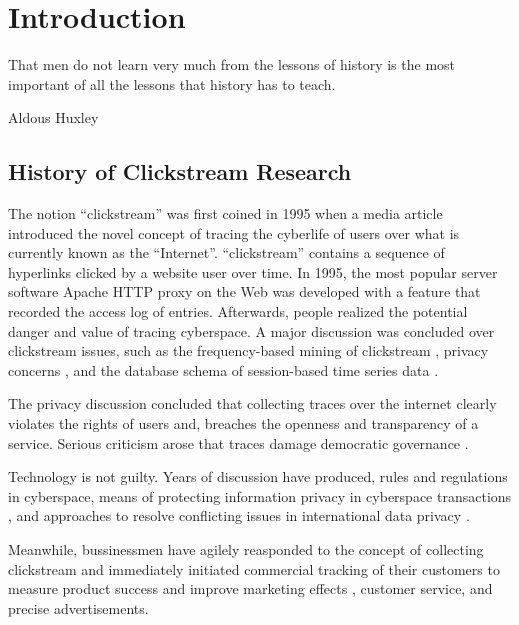 \section{Introduction}
\label{ch:intro}

\epigraph{That men do not learn very much from the lessons of history is the most important of all the lessons that history has to teach.}{Aldous Huxley}

\subsection{History of Clickstream Research}

The notion ``clickstream'' \cite{friedman1995} was first coined in 1995 when a media 
article introduced the novel concept of tracing the cyberlife of users over what is currently known
as the ``Internet''. ``clickstream'' contains a sequence of hyperlinks clicked by a 
website user over time. In 1995, the most popular server software 
Apache HTTP \cite{apache1995http} proxy on the Web was developed with a feature that 
recorded the access log of entries. Afterwards, people realized the potential danger and value 
of tracing cyberspace. A major discussion was concluded over clickstream issues, such as 
the frequency-based mining of clickstream \cite{brodwin1995}, privacy concerns
\cite{reidenberg1996governing}, and the database schema of session-based time series data 
\cite{courtheoux2000database}.

The privacy discussion concluded that collecting traces over the internet clearly violates 
the rights of users and,
breaches the openness and transparency of a service.
Serious criticism arose that traces damage democratic governance \cite{gindin1997lost}.

Technology is not guilty. Years of discussion have produced, rules 
\cite{reidenberg1996governing} and regulations \cite{skok1999establishing} in cyberspace,
means of protecting information privacy in cyberspace transactions \cite{kang1997information},
and approaches to resolve conflicting issues in international data privacy \cite{reidenberg1999resolving}.

Meanwhile, bussinessmen have agilely reasponded to the concept of collecting clickstream 
and immediately initiated commercial tracking of their customers to measure product success \cite{schonberg2000measuring}
and improve marketing effects \cite{novick1995}, customer service, and precise advertisements\cite{reagle1999platform, bucklin2000sticky}.

